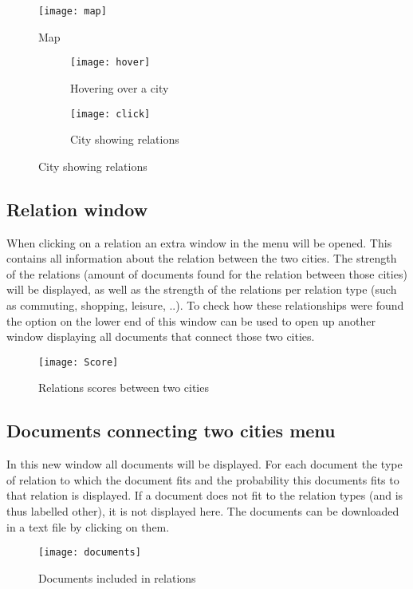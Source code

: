 \begin{figure}[H]
    \centering
    \texttt{[image: map]}
    \caption{Map}
    \label{fig:infoflow}
\end{figure}


\begin{figure}[H]
\centering
\begin{subfigure}{.5\textwidth}
  \centering
  \texttt{[image: hover]}
  \caption{Hovering over a city}
  \label{fig:sub1}
\end{subfigure}%
\begin{subfigure}{.5\textwidth}
  \centering
  \texttt{[image: click]}
  \caption{City showing relations}
  \label{fig:sub2}
\end{subfigure}
\label{fig:test}
\end{figure}


\subsection{Relation window}
When clicking on a relation an extra window in the menu will be opened. This contains all information about the relation between the two cities. The strength of the relations (amount of documents found for the relation between those cities) will be displayed, as well as the strength of the relations per relation type (such as commuting, shopping, leisure, ..). To check how these relationships were found the option on the lower end of this window  can be used to open up another window displaying all documents that connect those two cities.

\begin{figure}[H]
    \centering
    \texttt{[image: Score]}
    \caption{Relations scores between two cities}
    \label{fig:infoflow}
\end{figure}


\subsection{Documents connecting two cities menu}
In this new window all documents will be displayed. For each document the type of relation to which the document fits and the probability this documents fits to that relation is displayed. If a document does not fit to the relation types (and is thus labelled other), it is not displayed here. The documents can be downloaded in a text file by clicking on them.

\begin{figure}[H]
    \centering
    \texttt{[image: documents]}
    \caption{Documents included in relations}
    \label{fig:infoflow}
\end{figure}

